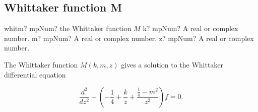 %
%
%
%
%
%
%
%
%
%
%
%

\subsection{Whittaker function M}

\begin{mpFunctionsExtract}
	\mpFunctionThree
	{whitm? mpNum? the Whittaker function $M$}
	{k? mpNum? A real or complex number.}
	{m? mpNum? A real or complex number.}
	{z? mpNum? A real or complex number.}		
\end{mpFunctionsExtract}

\vpara
The Whittaker function $M(k, m, z)$ gives a solution to the Whittaker differential equation

\begin{equation}
\frac{d^2}{dz^2} + \left(-\frac{1}{4} + \frac{k}{z} + \frac{\frac{1}{4}-m^2}{z^2}  \right)f=0.
\end{equation}

